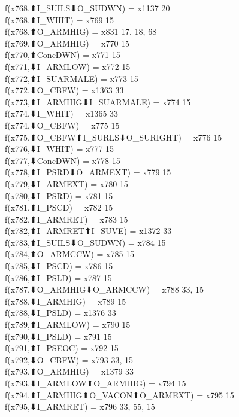 f(x768,⬆I_SUILS⬇O_SUDWN) = x1137 {20} \\
f(x768,⬆I_WHIT) = x769 {15} \\
f(x768,⬆O_ARMHIG) = x831 {17, 18, 68} \\
f(x769,⬆O_ARMHIG) = x770 {15} \\
f(x770,⬆ConcDWN) = x771 {15} \\
f(x771,⬇I_ARMLOW) = x772 {15} \\
f(x772,⬆I_SUARMALE) = x773 {15} \\
f(x772,⬇O_CBFW) = x1363 {33} \\
f(x773,⬆I_ARMHIG⬇I_SUARMALE) = x774 {15} \\
f(x774,⬇I_WHIT) = x1365 {33} \\
f(x774,⬇O_CBFW) = x775 {15} \\
f(x775,⬆O_CBFW⬆I_SURLS⬇O_SURIGHT) = x776 {15} \\
f(x776,⬇I_WHIT) = x777 {15} \\
f(x777,⬇ConcDWN) = x778 {15} \\
f(x778,⬆I_PSRD⬇O_ARMEXT) = x779 {15} \\
f(x779,⬇I_ARMEXT) = x780 {15} \\
f(x780,⬇I_PSRD) = x781 {15} \\
f(x781,⬆I_PSCD) = x782 {15} \\
f(x782,⬆I_ARMRET) = x783 {15} \\
f(x782,⬆I_ARMRET⬆I_SUVE) = x1372 {33} \\
f(x783,⬆I_SUILS⬇O_SUDWN) = x784 {15} \\
f(x784,⬆O_ARMCCW) = x785 {15} \\
f(x785,⬇I_PSCD) = x786 {15} \\
f(x786,⬆I_PSLD) = x787 {15} \\
f(x787,⬇O_ARMHIG⬇O_ARMCCW) = x788 {33, 15} \\
f(x788,⬇I_ARMHIG) = x789 {15} \\
f(x788,⬇I_PSLD) = x1376 {33} \\
f(x789,⬆I_ARMLOW) = x790 {15} \\
f(x790,⬇I_PSLD) = x791 {15} \\
f(x791,⬆I_PSEOC) = x792 {15} \\
f(x792,⬇O_CBFW) = x793 {33, 15} \\
f(x793,⬆O_ARMHIG) = x1379 {33} \\
f(x793,⬇I_ARMLOW⬆O_ARMHIG) = x794 {15} \\
f(x794,⬆I_ARMHIG⬆O_VACON⬆O_ARMEXT) = x795 {15} \\
f(x795,⬇I_ARMRET) = x796 {33, 55, 15} \\
